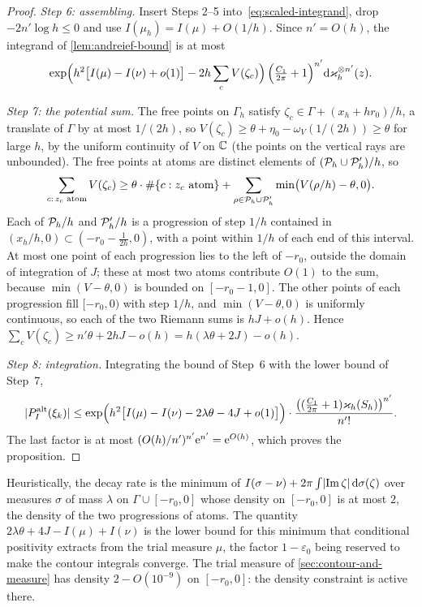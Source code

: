 \begin{proof}
\emph{Step 6: assembling.} Insert Steps 2--5 into~\eqref{eq:scaled-integrand}, drop
$-2n'\log h\le0$ and use $I(\mu_h)=I(\mu)+O(1/h)$. Since $n'=O(h)$, the integrand of
\cref{lem:andreief-bound} is at most
\[
  \exp\Bigl(h^2\bigl[I(\mu)-I(\nu)+o(1)\bigr]-2h\sum_cV(\zeta_c)\Bigr)\,
  \Bigl(\tfrac{C_1}{2\pi}+1\Bigr)^{n'}\mathrm{d}\varkappa_h^{\otimes n'}(z).
\]

\emph{Step 7: the potential sum.} The free points on $\Gamma_h$ satisfy
$\zeta_c\in\Gamma+(x_h+hr_0)/h$, a translate of $\Gamma$ by at most $1/(2h)$, so
$V(\zeta_c)\ge\theta+\eta_0-\omega_V(1/(2h))\ge\theta$ for large $h$, by the uniform continuity of
$V$ on $\mathbb{C}$ (the points on the vertical rays are unbounded). The free points at atoms are distinct
elements of $(\mathcal{P}_h\cup\mathcal{P}'_h)/h$, so
\[
  \sum_{c:\,z_c\text{ atom}}V(\zeta_c)\ge\theta\cdot\#\{c:z_c\text{ atom}\}
  +\sum_{\rho\in\mathcal{P}_h\cup\mathcal{P}'_h}\min\bigl(V(\rho/h)-\theta,0\bigr).
\]
Each of $\mathcal{P}_h/h$ and $\mathcal{P}'_h/h$ is a progression of step $1/h$ contained in
$(x_h/h,0)\subset(-r_0-\frac1{2h},0)$, with a point within $1/h$ of each end of this interval.
At most one point of each progression lies to the left of $-r_0$, outside the domain of
integration of $J$; these at most two atoms contribute $O(1)$ to the sum, because
$\min(V-\theta,0)$ is bounded on $[-r_0-1,0]$. The other points of each progression fill
$[-r_0,0)$ with step $1/h$, and $\min(V-\theta,0)$ is uniformly continuous, so each of the two
Riemann sums is $hJ+o(h)$. Hence $\sum_cV(\zeta_c)\ge n'\theta+2hJ-o(h)=h(\lambda\theta+2J)-o(h)$.

\emph{Step 8: integration.} Integrating the bound of Step~6 with the lower bound of Step~7,
\[
  \lvert P^{\mathrm{alt}}_I(\xi_k)\rvert\le\exp\Bigl(h^2\bigl[I(\mu)-I(\nu)-2\lambda\theta-4J+o(1)\bigr]\Bigr)
  \cdot\frac{\bigl((\frac{C_1}{2\pi}+1)\varkappa_h(S_h)\bigr)^{n'}}{n'!}.
\]
The last factor is at most $(O(h)/n')^{n'}\mathrm{e}^{n'}=\mathrm{e}^{O(h)}$, which proves the proposition.
\end{proof}

\begin{remark}\label{rem:energy-meaning}
Heuristically, the decay rate is the minimum of
$I(\sigma-\nu)+2\pi\int\lvert \operatorname{Im}\zeta\rvert\,\mathrm{d}\sigma(\zeta)$ over measures $\sigma$ of mass
$\lambda$ on $\Gamma\cup[-r_0,0]$ whose density on $[-r_0,0]$ is at most $2$, the density of the
two progressions of atoms. The quantity $2\lambda\theta+4J-I(\mu)+I(\nu)$ is the lower bound for
this minimum that conditional positivity extracts from the trial measure $\mu$, the factor
$1-\varepsilon_0$ being reserved to make the contour integrals converge. The trial measure of
\cref{sec:contour-and-measure} has density $2-O(10^{-9})$ on $[-r_0,0]$: the density constraint
is active there.
\end{remark}

